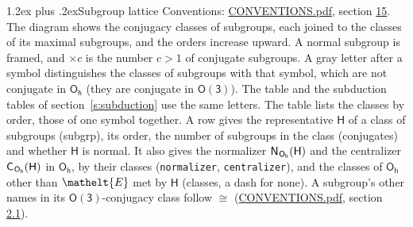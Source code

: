 \documentclass[10pt,a4paper]{article}
\makeatletter
\renewcommand\section{\@startsection{section}{1}{\z@}{-3ex plus -1ex minus -.2ex}%
  {1.2ex plus .2ex}{\normalfont\large\sffamily\bfseries\color{parttitle}}}
\numberwithin{equation}{section}
\newcommand{\eltfont}[1]{{\let\sigma\eltsigma\mathelt{#1}}}
\newcommand{\grp}[1]{\mathsf{#1}}
\newcommand{\cls}[1]{\eltfont{#1}}
\newcommand{\samecls}{\cong}
\newcommand{\hairsp}{\mkern1mu}
\makeatother
\begin{document}
\section{Subgroup lattice}\label{s:subgroups}
Conventions: \href{../../CONVENTIONS.pdf}{CONVENTIONS.pdf}, section \href{../../CONVENTIONS.pdf\#conv.15}{15}.
The diagram shows the conjugacy classes of subgroups, each joined to the classes of its maximal subgroups, and the orders increase upward. A normal subgroup is framed, and ${\times}c$ is the number $c > 1$ of conjugate subgroups. A gray letter after a symbol distinguishes the classes of subgroups with that symbol, which are not conjugate in $\grp{O_{h}}$ (they are conjugate in \href{O3.pdf}{$\grp{O(3)}$}). The table and the subduction tables of section~\ref{s:subduction} use the same letters. The table lists the classes by order, those of one symbol together. \label{n:group.H}\label{n:head.subgroup}\label{n:head.order}\label{n:head.conjugates}\label{n:head.normal}A row gives the representative $\grp{H}$ of a class of subgroups (subgrp), its order, the number of subgroups in the class (conjugates) and whether $\grp{H}$ is normal. \label{n:group.normalizer}\label{n:group.centralizer}\label{n:head.classes}It also gives the normalizer $\grp{N}_{\hairsp \grp{O_{h}}}(\grp{H})$ and the centralizer $\grp{C}_{\hairsp \grp{O_{h}}}(\grp{H})$ in $\grp{O_{h}}$, by their classes (\texttt{normalizer}, \texttt{centralizer}), and the classes of $\grp{O_{h}}$ other than $\cls{E}$ met by $\grp{H}$ (classes, a dash for none). A subgroup's other names in its \href{O3.pdf}{$\grp{O(3)}$}-conjugacy class follow $\samecls$ (\href{../../CONVENTIONS.pdf}{CONVENTIONS.pdf}, section \href{../../CONVENTIONS.pdf\#conv.2.1}{2.1}).
\end{document}
